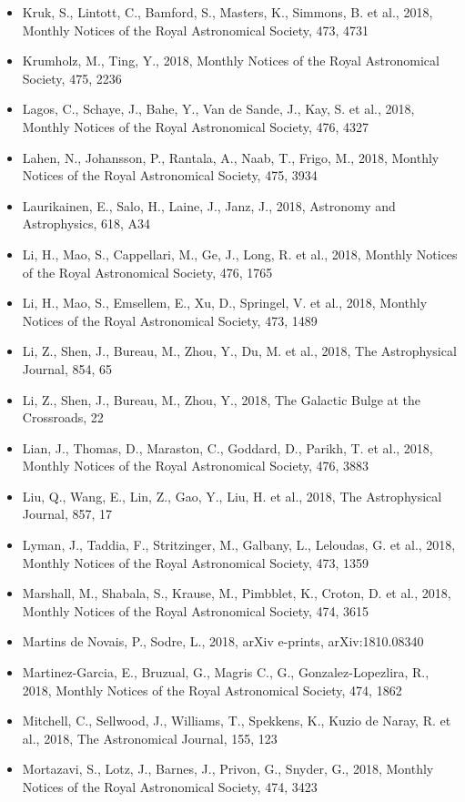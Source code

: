 \documentclass{letter}
\begin{document}
\begin{enumerate}
\begin{itemize}
\item Kruk, S., Lintott, C., Bamford, S., Masters, K., Simmons, B. et al., 2018, Monthly Notices of the Royal Astronomical Society, 473, 4731
\item Krumholz, M., Ting, Y., 2018, Monthly Notices of the Royal Astronomical Society, 475, 2236
\item Lagos, C., Schaye, J., Bahe, Y., Van de Sande, J., Kay, S. et al., 2018, Monthly Notices of the Royal Astronomical Society, 476, 4327
\item Lahen, N., Johansson, P., Rantala, A., Naab, T., Frigo, M., 2018, Monthly Notices of the Royal Astronomical Society, 475, 3934
\item Laurikainen, E., Salo, H., Laine, J., Janz, J., 2018, Astronomy and Astrophysics, 618, A34
\item Li, H., Mao, S., Cappellari, M., Ge, J., Long, R. et al., 2018, Monthly Notices of the Royal Astronomical Society, 476, 1765
\item Li, H., Mao, S., Emsellem, E., Xu, D., Springel, V. et al., 2018, Monthly Notices of the Royal Astronomical Society, 473, 1489
\item Li, Z., Shen, J., Bureau, M., Zhou, Y., Du, M. et al., 2018, The Astrophysical Journal, 854, 65
\item Li, Z., Shen, J., Bureau, M., Zhou, Y., 2018, The Galactic Bulge at the Crossroads, 22
\item Lian, J., Thomas, D., Maraston, C., Goddard, D., Parikh, T. et al., 2018, Monthly Notices of the Royal Astronomical Society, 476, 3883
\item Liu, Q., Wang, E., Lin, Z., Gao, Y., Liu, H. et al., 2018, The Astrophysical Journal, 857, 17
\item Lyman, J., Taddia, F., Stritzinger, M., Galbany, L., Leloudas, G. et al., 2018, Monthly Notices of the Royal Astronomical Society, 473, 1359
\item Marshall, M., Shabala, S., Krause, M., Pimbblet, K., Croton, D. et al., 2018, Monthly Notices of the Royal Astronomical Society, 474, 3615
\item Martins de Novais, P., Sodre, L., 2018, arXiv e-prints, arXiv:1810.08340
\item Martinez-Garcia, E., Bruzual, G., Magris C., G., Gonzalez-Lopezlira, R., 2018, Monthly Notices of the Royal Astronomical Society, 474, 1862
\item Mitchell, C., Sellwood, J., Williams, T., Spekkens, K., Kuzio de Naray, R. et al., 2018, The Astronomical Journal, 155, 123
\item Mortazavi, S., Lotz, J., Barnes, J., Privon, G., Snyder, G., 2018, Monthly Notices of the Royal Astronomical Society, 474, 3423

\end{itemize}
\end{enumerate}
\end{document}
